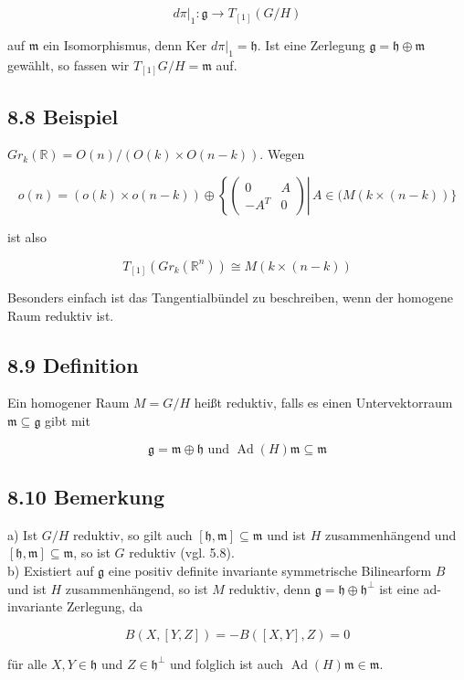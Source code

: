 \documentclass[10pt, letterpaper]{article}
\begin{document}
$$
\left.d \pi\right|_{1}: \mathfrak{g} \rightarrow T_{[1]}(G / H)
$$

auf $\mathfrak{m}$ ein Isomorphismus, denn Ker $\left.d \pi\right|_{1}=\mathfrak{h}$. Ist eine Zerlegung $\mathfrak{g}=\mathfrak{h} \oplus \mathfrak{m}$ gewählt, so fassen wir $T_{[1]} G / H=\mathfrak{m}$ auf.

\subsection*{8.8 Beispiel}
$G r_{k}(\mathbb{R})=O(n) /(O(k) \times O(n-k))$. Wegen

$$
o(n)=(o(k) \times o(n-k)) \oplus\left\{\left.\left(\begin{array}{cc}
0 & A \\
-A^{T} & 0
\end{array}\right) \right\rvert\, A \in(M(k \times(n-k))\}\right.
$$

ist also

$$
T_{[1]}\left(G r_{k}\left(\mathbb{R}^{n}\right)\right) \cong M(k \times(n-k))
$$

Besonders einfach ist das Tangentialbündel zu beschreiben, wenn der homogene Raum reduktiv ist.

\subsection*{8.9 Definition}
Ein homogener Raum $M=G / H$ heißt reduktiv, falls es einen Untervektorraum $\mathfrak{m} \subseteq \mathfrak{g}$ gibt mit

$$
\mathfrak{g}=\mathfrak{m} \oplus \mathfrak{h} \text { und } \operatorname{Ad}(H) \mathfrak{m} \subseteq \mathfrak{m}
$$

\subsection*{8.10 Bemerkung}
a) Ist $G / H$ reduktiv, so gilt auch $[\mathfrak{h}, \mathfrak{m}] \subseteq \mathfrak{m}$ und ist $H$ zusammenhängend und $[\mathfrak{h}, \mathfrak{m}] \subseteq \mathfrak{m}$, so ist $G$ reduktiv (vgl. 5.8).\\
b) Existiert auf $\mathfrak{g}$ eine positiv definite invariante symmetrische Bilinearform $B$ und ist $H$ zusammenhängend, so ist $M$ reduktiv, denn $\mathfrak{g}=\mathfrak{h} \oplus \mathfrak{h}^{\perp}$ ist eine ad-invariante Zerlegung, da

$$
B(X,[Y, Z])=-B([X, Y], Z)=0
$$

für alle $X, Y \in \mathfrak{h}$ und $Z \in \mathfrak{h}^{\perp}$ und folglich ist auch $\operatorname{Ad}(H) \mathfrak{m} \in \mathfrak{m}$.
\end{document}
